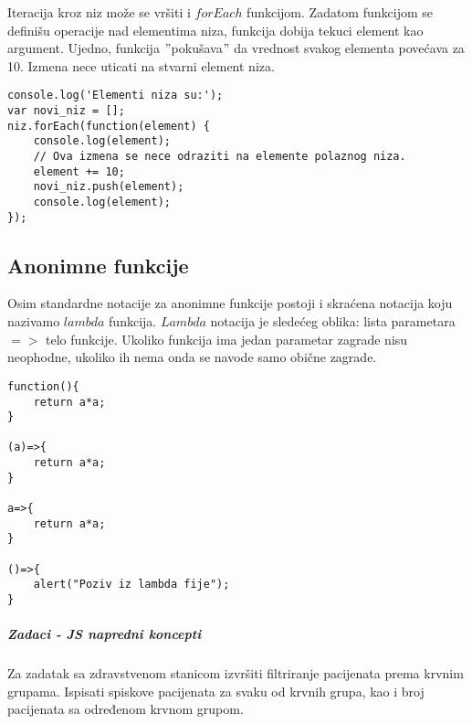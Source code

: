 Iteracija kroz niz može se vršiti i $forEach$ funkcijom. Zadatom funkcijom se definišu operacije nad elementima niza, funkcija dobija tekuci element kao argument. Ujedno, funkcija $"$pokušava$"$ da vrednost svakog elementa povećava za 10. Izmena nece uticati na stvarni element niza.
\begin{lstlisting}[backgroundcolor = \color{lightgray}, breaklines=true]
console.log('Elementi niza su:');
var novi_niz = [];
niz.forEach(function(element) {
    console.log(element);
    // Ova izmena se nece odraziti na elemente polaznog niza.
    element += 10;
    novi_niz.push(element);
    console.log(element);
});
\end{lstlisting}

\subsection{Anonimne funkcije}
Osim standardne notacije za anonimne funkcije postoji i skraćena notacija koju nazivamo $lambda$ funkcija. $Lambda$ notacija je sledećeg oblika: lista parametara $=>$ telo funkcije. Ukoliko funkcija ima jedan parametar zagrade nisu neophodne, ukoliko ih nema onda se navode samo obične zagrade.
\begin{lstlisting}[backgroundcolor = \color{lightgray}, breaklines=true]
function(){
	return a*a;
} 

(a)=>{
    return a*a;
}

a=>{
    return a*a;
}

()=>{
    alert("Poziv iz lambda fije");
}
\end{lstlisting}


\subparagraph{Zadaci - JS napredni koncepti}

\begin{primer}
Za zadatak sa zdravstvenom stanicom izvršiti filtriranje pacijenata prema krvnim grupama. Ispisati spiskove pacijenata za svaku od krvnih grupa, kao i broj pacijenata sa određenom krvnom grupom.
\end{primer}